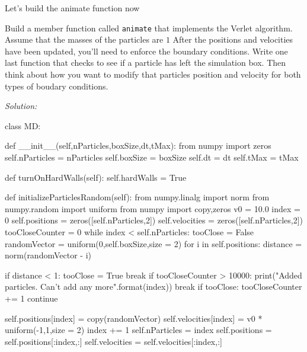 \begin{enumerate}
\probtwo  Let's build the animate function now
\begin{enumerate}
\subprob Build a member function called \verb!animate! that implements
the Verlet algorithm.  Assume that the masses of the particles are $1$
\subprob After the positions and velocities have been updated, you'll
need to enforce the boundary conditions.  Write one last function that
checks to see if a particle has left the simulation box.  Then think
about how you want to modify that particles position and velocity for
both types of boudary conditions.
\end{enumerate}
\end{enumerate}
\ifsolutions
\textit{Solution:}\\
\begin{codeexample}
\begin{VerbatimOut}{\listingFile}






class MD:

    def __init__(self,nParticles,boxSize,dt,tMax):
        from numpy import zeros
        self.nParticles = nParticles
        self.boxSize = boxSize
        self.dt = dt
        self.tMax = tMax

    def turnOnHardWalls(self):
        self.hardWalls = True

    def initializeParticlesRandom(self):
        from numpy.linalg import norm
        from numpy.random import uniform
        from numpy import copy,zeros
        v0 = 10.0
        index = 0
        self.positions = zeros([self.nParticles,2])
        self.velocities = zeros([self.nParticles,2])
        tooCloseCounter = 0
        while index < self.nParticles:
            tooClose = False
            randomVector = uniform(0,self.boxSize,size = 2)
            for i in self.positions:
                distance = norm(randomVector - i)

                if distance < 1:
                    tooClose = True
                    break
            if tooCloseCounter > 10000:
                print("Added {} particles. Can't add any more".format(index))
                break
            if tooClose:
                tooCloseCounter += 1
                continue

            self.positions[index] = copy(randomVector)
            self.velocities[index] = v0 * uniform(-1,1,size = 2)
            index += 1
        self.nParticles = index
        self.positions = self.positions[:index,:]
        self.velocities = self.velocities[:index,:]


\end{VerbatimOut}
\end{codeexample}
